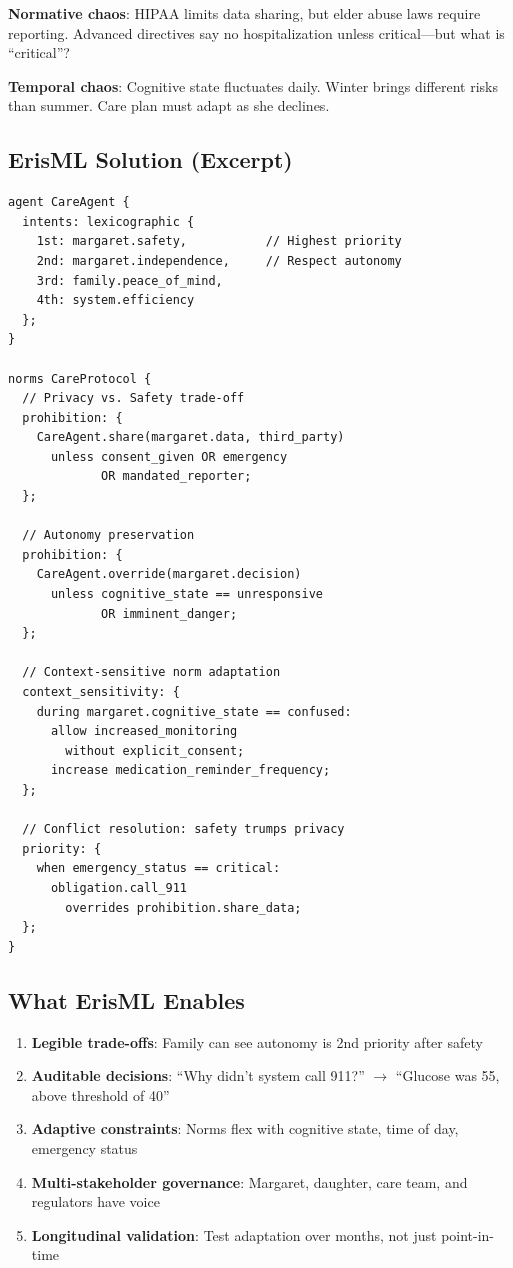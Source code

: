 \documentclass[conference]{IEEEtran}
\begin{document}
\textbf{Normative chaos}: HIPAA limits data sharing, but elder abuse
laws require reporting. Advanced directives say no hospitalization
unless critical---but what is ``critical''?

\textbf{Temporal chaos}: Cognitive state fluctuates daily. Winter brings
different risks than summer. Care plan must adapt as she declines.

\subsection{ErisML Solution (Excerpt)}

\begin{lstlisting}
agent CareAgent {
  intents: lexicographic {
    1st: margaret.safety,           // Highest priority
    2nd: margaret.independence,     // Respect autonomy
    3rd: family.peace_of_mind,
    4th: system.efficiency
  };
}

norms CareProtocol {
  // Privacy vs. Safety trade-off
  prohibition: {
    CareAgent.share(margaret.data, third_party)
      unless consent_given OR emergency
             OR mandated_reporter;
  };

  // Autonomy preservation
  prohibition: {
    CareAgent.override(margaret.decision)
      unless cognitive_state == unresponsive
             OR imminent_danger;
  };

  // Context-sensitive norm adaptation
  context_sensitivity: {
    during margaret.cognitive_state == confused:
      allow increased_monitoring
        without explicit_consent;
      increase medication_reminder_frequency;
  };

  // Conflict resolution: safety trumps privacy
  priority: {
    when emergency_status == critical:
      obligation.call_911
        overrides prohibition.share_data;
  };
}
\end{lstlisting}

\subsection{What ErisML Enables}

\begin{enumerate}
\item \textbf{Legible trade-offs}: Family can see autonomy is 2nd priority after safety
\item \textbf{Auditable decisions}: ``Why didn't system call 911?'' $\to$ ``Glucose was 55, above threshold of 40''
\item \textbf{Adaptive constraints}: Norms flex with cognitive state, time of day, emergency status
\item \textbf{Multi-stakeholder governance}: Margaret, daughter, care team, and regulators have voice
\item \textbf{Longitudinal validation}: Test adaptation over months, not just point-in-time
\end{enumerate}
\end{document}
